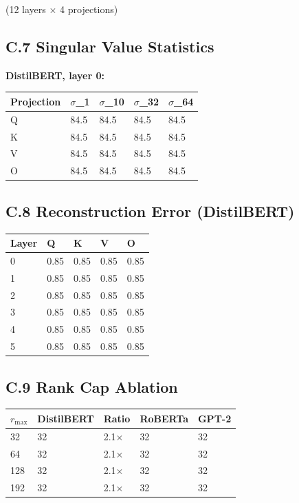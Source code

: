 (12 layers $\times$ 4 projections)

\subsection{C.7 Singular Value Statistics}

\textbf{DistilBERT, layer 0:}

\begin{table}[H]
\centering
\small
\begin{tabular}{lllll}
\toprule
\textbf{Projection} & \textbf{$\sigma$\_1} & \textbf{$\sigma$\_10} & \textbf{$\sigma$\_32} & \textbf{$\sigma$\_64} \\
\midrule
Q & 84.5 & 84.5 & 84.5 & 84.5 \\
K & 84.5 & 84.5 & 84.5 & 84.5 \\
V & 84.5 & 84.5 & 84.5 & 84.5 \\
O & 84.5 & 84.5 & 84.5 & 84.5 \\
\bottomrule
\end{tabular}
\end{table}

\subsection{C.8 Reconstruction Error (DistilBERT)}

\begin{table}[H]
\centering
\small
\begin{tabular}{lllll}
\toprule
\textbf{Layer} & \textbf{Q} & \textbf{K} & \textbf{V} & \textbf{O} \\
\midrule
0 & 0.85 & 0.85 & 0.85 & 0.85 \\
1 & 0.85 & 0.85 & 0.85 & 0.85 \\
2 & 0.85 & 0.85 & 0.85 & 0.85 \\
3 & 0.85 & 0.85 & 0.85 & 0.85 \\
4 & 0.85 & 0.85 & 0.85 & 0.85 \\
5 & 0.85 & 0.85 & 0.85 & 0.85 \\
\bottomrule
\end{tabular}
\end{table}

\subsection{C.9 Rank Cap Ablation}

\begin{table}[H]
\centering
\small
\begin{tabular}{lllll}
\toprule
\textbf{$r_\text{max}$} & \textbf{DistilBERT} & \textbf{Ratio} & \textbf{RoBERTa} & \textbf{GPT-2} \\
\midrule
32 & 32 & 2.1$\times$ & 32 & 32 \\
64 & 32 & 2.1$\times$ & 32 & 32 \\
128 & 32 & 2.1$\times$ & 32 & 32 \\
192 & 32 & 2.1$\times$ & 32 & 32 \\
\bottomrule
\end{tabular}
\end{table}

